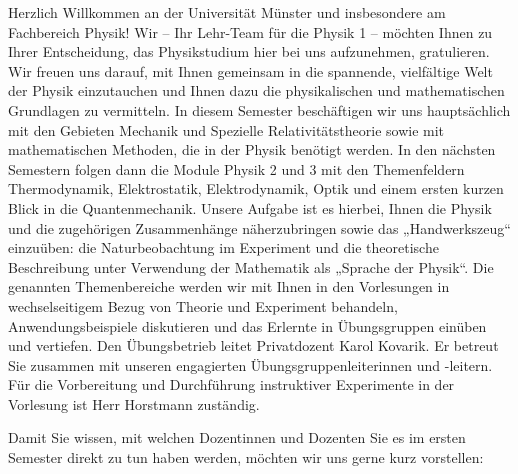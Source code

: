 \begin{multicols}{2}

Herzlich Willkommen an der Universität Münster und insbesondere am Fachbereich Physik! Wir – Ihr 
Lehr-Team für die Physik 1 – möchten Ihnen zu Ihrer Entscheidung, das Physikstudium hier bei uns 
aufzunehmen, gratulieren. Wir freuen uns darauf, mit Ihnen gemeinsam in die spannende, vielfältige 
Welt der Physik einzutauchen und Ihnen dazu die physikalischen und mathematischen Grundlagen zu 
vermitteln. In diesem Semester beschäftigen wir uns hauptsächlich mit den Gebieten Mechanik und 
Spezielle Relativitätstheorie sowie mit mathematischen Methoden, die in der Physik benötigt werden. 
In den nächsten Semestern folgen dann die Module Physik 2 und 3 mit den Themenfeldern 
Thermodynamik, Elektrostatik, Elektrodynamik, Optik und einem ersten kurzen Blick in die 
Quantenmechanik. Unsere Aufgabe ist es hierbei, Ihnen die Physik und die zugehörigen 
Zusammenhänge näherzubringen sowie das „Handwerkszeug“ einzuüben:  die Naturbeobachtung im 
Experiment und die theoretische Beschreibung unter Verwendung der Mathematik als „Sprache der 
Physik“. Die genannten Themenbereiche werden wir mit Ihnen in den Vorlesungen in wechselseitigem 
Bezug von Theorie und Experiment behandeln, Anwendungsbeispiele diskutieren und das Erlernte in 
Übungsgruppen einüben und vertiefen. Den Übungsbetrieb leitet Privatdozent Karol Kovarik. Er 
betreut Sie zusammen mit unseren engagierten Übungsgruppenleiterinnen und -leitern. Für die 
Vorbereitung und Durchführung instruktiver Experimente in der Vorlesung ist Herr Horstmann 
zuständig. 

Damit Sie wissen, mit welchen Dozentinnen und Dozenten Sie es im ersten Semester direkt zu tun 
haben werden, möchten wir uns gerne kurz vorstellen:


\end{multicols}
